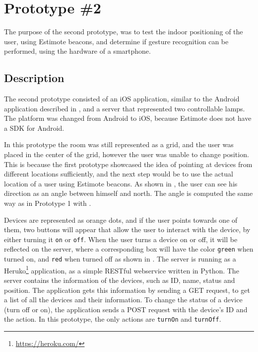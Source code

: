 \section{Prototype \#2}
\label{sec:implementation:prototypes:prototype2}
The purpose of the second prototype, 
was to test the indoor positioning of the user, 
using Estimote beacons, 
and determine if gesture recognition can be performed, 
using the hardware of a smartphone.

\subsection{Description}
The second prototype consisted of an iOS application, 
similar to the Android application described in , 
and a server that represented two controllable lamps.
The platform was changed from Android to iOS, 
because Estimote does not have a SDK for Android.

In this prototype the room was still represented as a grid, 
and the user was placed in the center of the grid, 
however the user was unable to change position.
This is because the first prototype showcased the idea of pointing at devices from different locations sufficiently, 
and the next step would be to use the actual location of a user using Estimote beacons.
As shown in , 
the user can see his direction as an angle between himself and north.
The angle is computed the same way as in Prototype 1 with .

Devices are represented as orange dots, 
and if the user points towards one of them, 
two buttons will appear that allow the user to interact with the device, 
by either turning it \texttt{on} or \texttt{off}.
When the user turns a device on or off, 
it will be reflected on the server, 
where a corresponding box will have the color \texttt{green} when turned on, 
and \texttt{red} when turned off as shown in .
The server is running as a Heruko\footnote{\url{https://heroku.com/}} application, 
as a simple RESTful webservice written in Python. 
The server contains the information of the devices, 
such as ID, name, status and position.
The application gets this information by sending a GET request, 
to get a list of all the devices and their information. 
To change the status of a device (turn off or on), 
the application sends a POST request with the device's ID and the action. 
In this prototype, the only actions are \texttt{turnOn} and \texttt{turnOff}.

